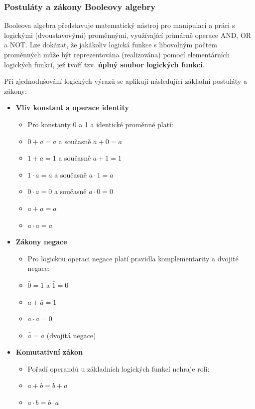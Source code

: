     \subsubsection{Postuláty a zákony Booleovy algebry}
        Booleova algebra představuje matematický nástroj pro manipulaci a práci s logickými (dvoustavovými) proměnnými, využívající primárně operace AND, OR a NOT. Lze dokázat, že jakákoliv logická funkce s libovolným počtem proměnných může být reprezentována (realizována) pomocí elementárních logických funkcí, jež tvoří tzv. \textbf{úplný soubor logických funkcí}.
        
        Při zjednodušování logických výrazů se aplikují následující základní postuláty a zákony:
        
        \begin{itemize}
            \item \textbf{Vliv konstant a operace identity}
            \begin{itemize}
                \item Pro konstanty 0 a 1 a identické proměnné platí:
                \item $0 + a = a$ a současně $a + 0 = a$
                \item $1 + a = 1$ a současně $a + 1 = 1$
                \item $1 \cdot a = a$ a současně $a \cdot 1 = a$
                \item $0 \cdot a = 0$ a současně $a \cdot 0 = 0$
                \item $a + a = a$
                \item $a \cdot a = a$
            \end{itemize}
            
            \item \textbf{Zákony negace}
            \begin{itemize}
                \item Pro logickou operaci negace platí pravidla komplementarity a dvojité negace:
                \item $\bar{0} = 1$ a $\bar{1} = 0$
                \item $a + \bar{a} = 1$
                \item $a \cdot \bar{a} = 0$
                \item $\bar{\bar{a}} = a$ (dvojitá negace)
            \end{itemize}

            \item \textbf{Komutativní zákon}
            \begin{itemize}
                \item Pořadí operandů u základních logických funkcí nehraje roli:
                \item $a + b = b + a$
                \item $a \cdot b = b \cdot a$
            \end{itemize}
        

\end{itemize}
